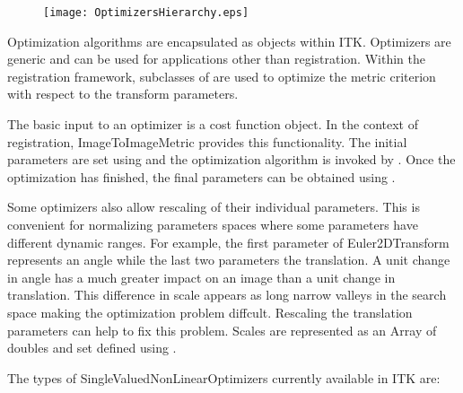 


\begin{figure}
\center
\texttt{[image: OptimizersHierarchy.eps]}
\label{fig:OptimizersHierarchy}
\end{figure}

Optimization algorithms are encapsulated as  objects
within ITK. Optimizers are generic and can be used for applications other than
registration.  Within the registration framework, subclasses of
 are used to optimize the metric
criterion with respect to the transform parameters.


The basic input to an optimizer is a cost function object. In the context
of registration, ImageToImageMetric provides this functionality.
The initial parameters are set using  and
the optimization algorithm is invoked by .
Once the optimization has finished, the final parameters can be obtained
using .

Some optimizers also allow rescaling of their individual parameters. This
is convenient for normalizing parameters spaces where some parameters
have different dynamic ranges. For example, the first parameter of
Euler2DTransform represents an angle while the last two parameters
the translation. A unit change in angle has a much greater impact on
an image than a unit change in translation. This difference in scale appears
as long narrow valleys in the search space making the optimization problem
diffcult. Rescaling the translation parameters can help to fix this problem.
Scales are represented as an Array of doubles and set defined using
.

The types of SingleValuedNonLinearOptimizers currently available
in ITK are:


